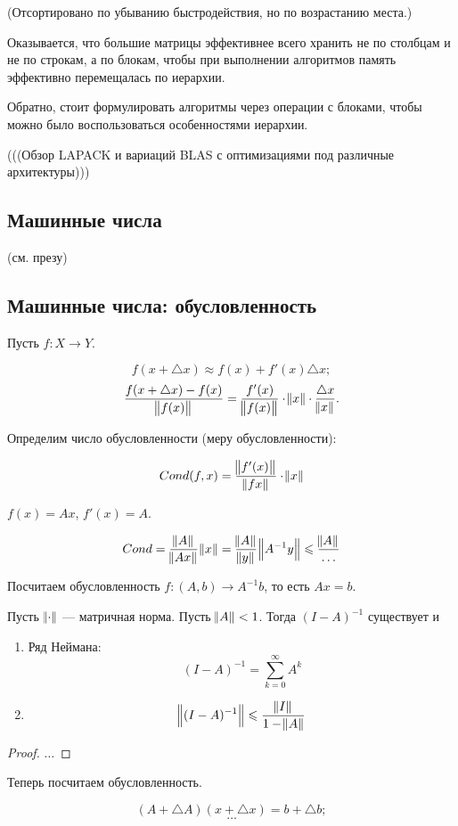 (Отсортировано по убыванию быстродействия, но по возрастанию места.)

Оказывается, что большие матрицы эффективнее всего хранить не по столбцам и не
по строкам, а по блокам, чтобы при выполнении алгоритмов память эффективно
перемещалась по иерархии.

Обратно, стоит формулировать алгоритмы через операции с блоками, чтобы можно
было воспользоваться особенностями иерархии.

(((Обзор LAPACK и вариаций BLAS с оптимизациями под различные архитектуры)))

\subsection{Машинные числа}

(см. презу)

\subsection{Машинные числа: обусловленность}

Пусть $f: X \to Y$.

\[
    f(x + \triangle x) \approx f(x) + f'(x) \triangle x;
\]
\[
    \frac{f(x + \triangle x) - f(x)}{\norm{f(x)}} = \frac{f'(x)}{\norm{f(x)}}
    \cdot \norm{x} \cdot \frac{\triangle x}{\norm{x}}.
\]

Определим число обусловленности (меру обусловленности):

\[
    Cond(f, x) = \frac{\norm{f'(x)}}{\norm{f{x}}} \cdot \norm{x}
\]

\begin{example}
    $f(x) = Ax$, $f'(x) = A$.

    \[
        Cond = \frac{\norm{A}}{\norm{A x}} \norm{x}
        = \frac{\norm{A}}{\norm{y}} \norm{A^{-1} y}
        \leqslant \frac{\norm{A}} \ldots
    \]
\end{example}

Посчитаем обусловленность $f: (A, b) \to A^{-1} b$, то есть $A x = b$.

\begin{lemma}
    Пусть $\norm{\cdot}$ --- матричная норма. Пусть $\norm{A} < 1$. Тогда
    $(I - A)^{-1}$ существует и

    \begin{enumerate}
        \item Ряд Неймана:
            \[
                (I - A)^{-1} = \sum_{k = 0}^\infty A^k
            \]
        \item
            \[
                \norm{(I - A)^{-1}} \leqslant \frac{\norm{I}}{1 - \norm{A}}
            \]
    \end{enumerate}
\end{lemma}

\begin{proof}
    $\dots$
\end{proof}

Теперь посчитаем обусловленность.

\[
    (A + \triangle A) (x + \triangle x) = b + \triangle b;
\]
\[
    \ldots
\]
